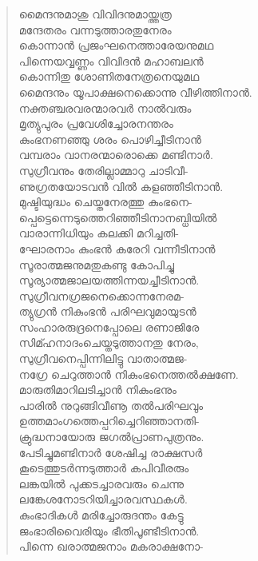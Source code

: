 \begin{verse}
മൈന്ദനുമാശു വിവിദനുമായ്ത്തത്ര\\
മന്ദേതരം വന്നടുത്താരതുനേരം\\
കൊന്നാന്‍ പ്രജംഘനെത്താരേയനുമഥ\\
പിന്നെയവ്വണ്ണം വിവിദന്‍ മഹാബലന്‍\\
കൊന്നിതു ശോണിതനേത്രനെയുമഥ\\
മൈന്ദനും യൂപാക്ഷനെക്കൊന്നു വീഴിത്തിനാന്‍.\\
നക്തഞ്ചരവരന്മാരവര്‍ നാല്‍വരും\\
മൃത്യുപുരം പ്രവേശിച്ചോരനന്തരം\\
കുംഭനണഞ്ഞു ശരം പൊഴിച്ചീടിനാന്‍\\
വമ്പരാം വാനരന്മാരൊക്കെ മണ്ടിനാര്‍.\\
സുഗ്രീവനും തേരില്ലാമ്മാറു ചാടിവീ-\\
ണുഗ്രതയോടവന്‍ വില്‍ കളഞ്ഞീടിനാന്‍.\\
മുഷ്ടിയുദ്ധം ചെയ്തനേരത്തു കുംഭനെ-\\
പ്പെട്ടെന്നെടുത്തെറിഞ്ഞീടിനാനബ്ധിയില്‍\\
വാരാന്നിധിയും കലക്കി മറിച്ചതി-\\
ഘോരനാം കുംഭന്‍ കരേറി വന്നീടിനാന്‍\\
സൂരാത്മജനുമതുകണ്ടു കോപിച്ചു\\
സൂര്യാത്മജാലയത്തിന്നയച്ചീടിനാന്‍.\\
സുഗ്രീവനഗ്രജനെക്കൊന്നനേരമ-\\
ത്യുഗ്രന്‍ നികുംഭന്‍ പരിഘവുമായുടന്‍\\
സംഹാരരുദ്രനെപ്പോലെ രണാജിരേ\\
സിമ്ഹനാദംചെയ്തടുത്താനതു നേരം,\\
സുഗ്രീവനെപ്പിന്നിലിട്ടു വാതാത്മജ-\\
നഗ്രേ ചെറുത്താന്‍ നികുംഭനെത്തല്‍ക്ഷണേ.\\
മാരുതിമാറിലടിച്ചാന്‍ നികുംഭനും\\
പാരില്‍ നുറുങ്ങിവീണൂ തല്‍പരിഘവും\\
ഉത്തമാംഗത്തെപ്പറിച്ചെറിഞ്ഞാനതി-\\
ക്രുദ്ധനായോരു ജഗല്‍പ്രാണപുത്രനും.\\
പേടിച്ചുമണ്ടിനാര്‍ ശേഷിച്ച രാക്ഷസര്‍\\
കൂടെത്തുടര്‍ന്നടുത്താര്‍ കപിവീരരും\\
ലങ്കയില്‍ പുക്കടച്ചാരവരും ചെന്നു\\
ലങ്കേശനോടറിയിച്ചാരവസ്ഥകള്‍.\\
കുംഭാദികള്‍ മരിച്ചോരുദന്തം കേട്ടു\\
ജംഭാരിവൈരിയും ഭീതിപൂണ്ടീടിനാന്‍.\\
പിന്നെ ഖരാത്മജനാം മകരാക്ഷനോ-\\

\end{verse}
